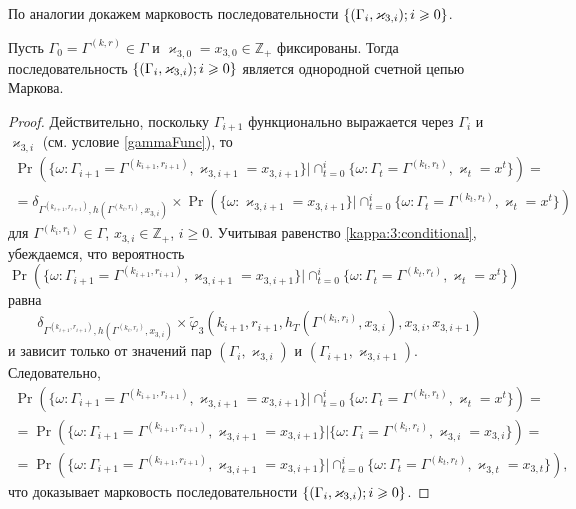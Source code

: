 \documentclass{report}
\newcommand{\MarkThree}{\{(\Gamma_i, \varkappa_{3,i}); \hm{} i \geqslant 0\}}
\begin{document}
По аналогии докажем марковость последовательности $\MarkThree$.
\begin{theorem}
Пусть $\Gamma_0=\Gamma^{(k,r)}\in \Gamma$ и $\varkappa_{3,0}=x_{3,0}\in \mathbb{Z}_+$ фиксированы. Тогда последовательность $\MarkThree$ является однородной счетной цепью Маркова.
\end{theorem}
\begin{proof}
Действительно, поскольку $\Gamma_{i+1}$ функционально выражается через $\Gamma_i$ и $\varkappa_{3,i}$ (см. условие \eqref{gammaFunc}), то
\begin{multline*}
\Pr (\{ \omega\colon \Gamma_{i+1} =\Gamma^{(k_{i+1},r_{i+1})},\varkappa_{3,i+1} = x_{3,i+1}\} |\cap_{t=0}^{i}\{\omega\colon  \Gamma_t=\Gamma^{(k_t,r_t)}, \varkappa_t=x^t\})=\\
=\delta_{\Gamma^{(k_{i+1},r_{i+1})},h(\Gamma^{(k_i,r_i)},x_{3,i})}\times \Pr (\{ \omega\colon  \varkappa_{3,i+1} = x_{3,i+1}\} |\cap_{t=0}^{i}\{\omega\colon  \Gamma_t=\Gamma^{(k_t,r_t)}, \varkappa_t=x^t\})
\end{multline*}
для $\Gamma^{(k_i,r_i)}\in \Gamma$, $x_{3,i}\in {\mathbb Z}_+$, $i\geqslant 0$. Учитывая равенство \eqref{kappa:3:conditional}, убеждаемся, что вероятность 
$$
\Pr (\{\omega\colon  \Gamma_{i+1} =\Gamma^{(k_{i+1},r_{i+1})},\varkappa_{3,i+1} = x_{3,i+1}\} |\cap_{t=0}^{i}\{\omega\colon \Gamma_t=\Gamma^{(k_t,r_t)}, \varkappa_t=x^t\}) 
$$ 
равна
$$
\delta_{\Gamma^{(k_{i+1},r_{i+1})},h(\Gamma^{(k_i,r_i)},x_{3,i})} \times \widetilde{\varphi}_3(k_{i+1},r_{i+1},h_T(\Gamma^{(k_i,r_i)},x_{3,i}),x_{3,i},x_{3,i+1})
$$
и зависит только от значений пар $(\Gamma_i,\varkappa_{3,i})$ и $(\Gamma_{i+1},\varkappa_{3,i+1})$. Следовательно, 
\begin{multline*}
\Pr (\{ \omega\colon \Gamma_{i+1} =\Gamma^{(k_{i+1},r_{i+1})},\varkappa_{3,i+1} = x_{3,i+1}\} |\cap_{t=0}^{i}\{\omega\colon \Gamma_t=\Gamma^{(k_t,r_t)}, \varkappa_t=x^t\})=\\
=\Pr (\{\omega\colon   \Gamma_{i+1} =\Gamma^{(k_{i+1},r_{i+1})},\varkappa_{3,i+1} = x_{3,i+1}\} |\{\omega\colon  \Gamma_i=\Gamma^{(k_i,r_i)}, \varkappa_{3,i}=x_{3,i}\}) = \\
=\Pr (\{\omega\colon \Gamma_{i+1} =\Gamma^{(k_{i+1},r_{i+1})},\varkappa_{3,i+1} = x_{3,i+1}\} |\cap_{t=0}^{i}\{ \omega\colon \Gamma_t=\Gamma^{(k_t,r_t)}, \varkappa_{3,t}=x_{3,t}\}),
\end{multline*}
что доказывает марковость последовательности $\MarkThree$.
\end{proof}
\end{document}
